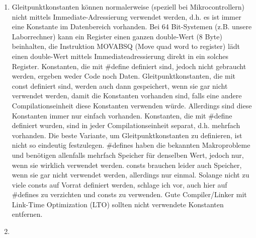\begin{enumerate}

\noindent\makebox[\linewidth]{\rule{\paperwidth}{0.4pt}}

\noindent\makebox[\linewidth]{\rule{\paperwidth}{0.4pt}}

\noindent\makebox[\linewidth]{\rule{\paperwidth}{0.4pt}}

\noindent\makebox[\linewidth]{\rule{\paperwidth}{0.4pt}}

\noindent\makebox[\linewidth]{\rule{\paperwidth}{0.4pt}}

  \item Gleitpunktkonstanten können normalerweise (speziell bei Mikrocontrollern) nicht mittels Immediate-Adressierung verwendet werden, d.h. es ist immer eine Konstante im Datenbereich vorhanden. Bei 64 Bit-Systemen (z.B. unsere Laborrechner) kann ein Register einen ganzen double-Wert (8 Byte) beinhalten, die Instruktion MOVABSQ (Move quad word to register) lädt einen double-Wert mittels Immediateadressierung direkt in ein solches Register. Konstanten, die mit \#define definiert sind, jedoch nicht gebraucht werden, ergeben weder Code noch Daten. Gleitpunktkonstanten, die mit const definiert sind, werden auch dann gespeichert, wenn sie gar nicht verwendet werden, damit die Konstanten vorhanden sind, falls eine andere Compilationseinheit diese Konstanten verwenden würde. Allerdings sind diese Konstanten immer nur einfach vorhanden. Konstanten, die mit \#define definiert wurden, sind in jeder Compilationseinheit separat, d.h. mehrfach vorhanden. Die beste Variante, um Gleitpunktkonstanten zu definieren, ist nicht so eindeutig festzulegen. \#defines haben die bekannten Makroprobleme und benötigen allenfalls mehrfach Speicher für denselben Wert, jedoch nur, wenn sie wirklich verwendet werden. consts brauchen leider auch Speicher, wenn sie gar nicht verwendet werden, allerdings nur einmal. Solange nicht zu viele consts auf Vorrat definiert werden, schlage ich vor, auch hier auf \#defines zu verzichten und consts zu verwenden. Gute Compiler/Linker mit Link-Time Optimization (LTO) sollten nicht verwendete Konstanten entfernen.

  \item
  
  \noindent\makebox[\linewidth]{\rule{\paperwidth}{0.4pt}}
  
  \noindent\makebox[\linewidth]{\rule{\paperwidth}{0.4pt}}
  
  \noindent\makebox[\linewidth]{\rule{\paperwidth}{0.4pt}}
  
  \noindent\makebox[\linewidth]{\rule{\paperwidth}{0.4pt}}
  
  \noindent\makebox[\linewidth]{\rule{\paperwidth}{0.4pt}}
\end{enumerate}

